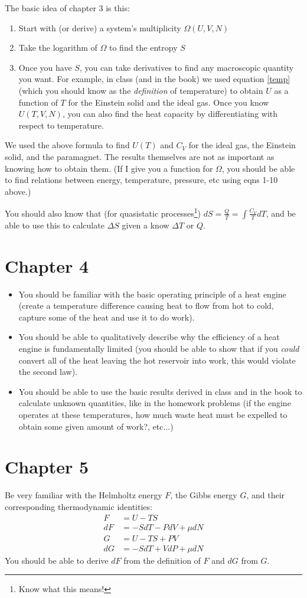 \documentclass{article}
\begin{document}
The basic idea of chapter 3 is this:
\begin{enumerate}
	\item Start with (or derive) a system's multiplicity $\Omega(U,V,N)$
	\item Take the logarithm of $\Omega$ to find the entropy $S$
	\item Once you have $S$, you can take derivatives to find any macroscopic quantity you want. For example, in class (and in the book) we used equation \ref{temp} (which you should know as the \textit{definition} of temperature) to obtain $U$ as a function of $T$ for the Einstein solid and the ideal gas. Once you know $U(T,V,N)$, you can also find the heat capacity by differentiating with respect to temperature.
\end{enumerate}
We used the above formula to find $U(T)$ and $C_V$ for the ideal gas, the Einstein solid, and the paramagnet. The results themselves are not as important as knowing how to obtain them. (If I give you a function for $\Omega$, you should be able to find relations between energy, temperature, pressure, etc using eqns 1-10 above.)

You should also know that (for quasistatic processes\footnote{Know what this means!}) $dS=\frac{Q}{T}=\int \frac{C_V}{T}dT$, and be able to use this to calculate $\Delta S$ given a know $\Delta T$ or $Q$.
\section*{Chapter 4}
\begin{itemize}
	\item You should be familiar with the basic operating principle of a heat engine (create a temperature difference causing heat to flow from hot to cold, capture some of the heat and use it to do work). 
	\item You should be able to qualitatively describe why the efficiency of a heat engine is fundamentally limited (you should be able to show that if you \textit{could} convert all of the heat leaving the hot reservoir into work, this would violate the second law).
	\item You should be able to use the basic results derived in class and in the book to calculate unknown quantities, like in the homework problems (if the engine operates at these temperatures, how much waste heat must be expelled to obtain some given amount of work?, etc...)
\end{itemize}

\section*{Chapter 5}
Be very familiar with the Helmholtz energy $F$, the Gibbs energy $G$, and their corresponding thermodynamic identities:
\begin{align}
	F&=U-TS\\
	dF&=-SdT-PdV+\mu dN\\
	G&=U-TS+PV\\
	dG&=-SdT+VdP+\mu dN
\end{align}
You should be able to derive $dF$ from the definition of $F$ and $dG$ from $G$.
\end{document}
